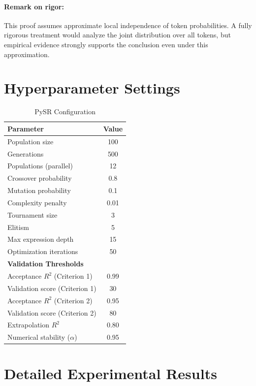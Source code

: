 \documentclass[twoside,11pt]{article}
\begin{document}
\paragraph{Remark on rigor:} This proof assumes approximate local independence of token probabilities. A fully rigorous treatment would analyze the joint distribution over all tokens, but empirical evidence strongly supports the conclusion even under this approximation.

\section{Hyperparameter Settings}
\label{app:hyperparameters}

\begin{table}[H]
\centering
\caption{PySR Configuration}
\label{tab:hyperparameters}
\begin{tabular}{@{}lc@{}}
\toprule
\textbf{Parameter} & \textbf{Value} \\
\midrule
Population size & 100 \\
Generations & 500 \\
Populations (parallel) & 12 \\
Crossover probability & 0.8 \\
Mutation probability & 0.1 \\
Complexity penalty & 0.01 \\
Tournament size & 3 \\
Elitism & 5 \\
Max expression depth & 15 \\
Optimization iterations & 50 \\
\midrule
\textbf{Validation Thresholds} & \\
\midrule
Acceptance $R^2$ (Criterion 1) & 0.99 \\
Validation score (Criterion 1) & 30 \\
Acceptance $R^2$ (Criterion 2) & 0.95 \\
Validation score (Criterion 2) & 80 \\
Extrapolation $R^2$ & 0.80 \\
Numerical stability ($\alpha$) & 0.95 \\
\bottomrule
\end{tabular}
\end{table}

\section{Detailed Experimental Results}
\label{app:detailed_results}
\end{document}
